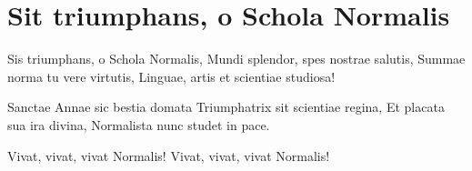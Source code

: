 \section{Sit triumphans, o Schola Normalis}
\subtitle{Sulla melodia di “Salve invicta Juditha formosa” di A. Vivaldi}

\subtitle{Ogni verso si canta due volte}
\begin{canzone}
Sis triumphans, o Schola Normalis,
Mundi splendor, spes nostrae salutis,
Summae norma tu vere virtutis,
Linguae, artis et scientiae studiosa!

Sanctae Annae sic bestia domata
Triumphatrix sit scientiae regina,
Et placata sua ira divina,
Normalista nunc studet in pace.

Vivat, vivat, vivat Normalis!
Vivat, vivat, vivat Normalis!
\end{canzone}

